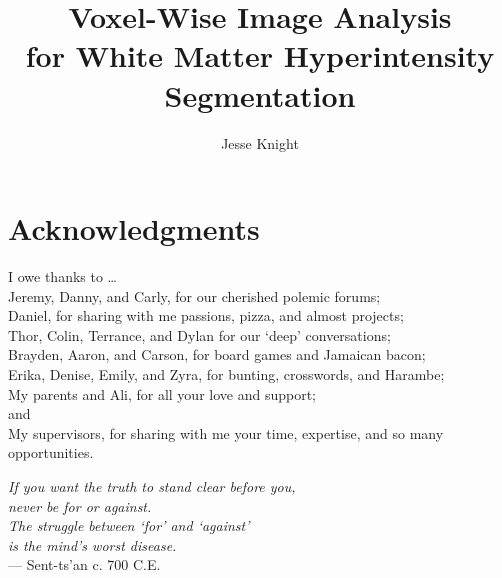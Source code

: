 \title{Voxel-Wise Image Analysis\\for White Matter Hyperintensity Segmentation}
\author{Jesse Knight}



\maketitle
\clearpage{}
\begin{abstractpage}
  
\end{abstractpage}
\clearpage{}
\setcounter{page}{3}
\section*{Acknowledgments}
I owe thanks to \dots
\\Jeremy, Danny, and Carly, for our cherished polemic forums;
\\Daniel, for sharing with me passions, pizza, and almost projects;
\\Thor, Colin, Terrance, and Dylan for our `deep' conversations;
\\Brayden, Aaron, and Carson, for board games and Jamaican bacon;
\\Erika, Denise, Emily, and Zyra, for bunting, crosswords, and Harambe;
\\My parents and Ali, for all your love and support;
\\and
\\My supervisors, for sharing with me your time, expertise, and so many opportunities.
\vfill
\begin{singlespace}
  \hspace*{4.0cm}\textit{If you want the truth to stand clear before you,}\\
  \hspace*{4.5cm}\textit{never be for or against.}                        \\
  \hspace*{4.0cm}\textit{The struggle between `for' and `against'}        \\
  \hspace*{4.5cm}\textit{is the mind's worst disease.}                    \\[0.5em]
  \hspace*{9.0cm}\normalfont{} --- Sent-ts'an c. 700 C.E.
\end{singlespace}

